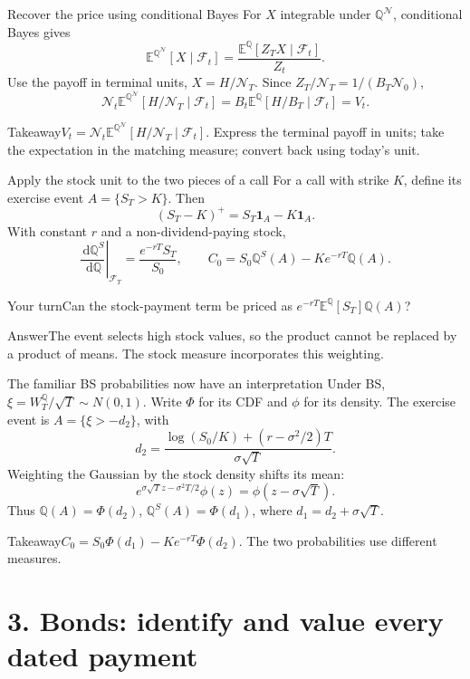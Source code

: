 \documentclass[handout,10pt,t,aspectratio=169]{beamer}
\newenvironment{pausebox}{\begin{block}{Your turn}}{\end{block}}
\newenvironment{answerbox}{\begin{exampleblock}{Answer}}{\end{exampleblock}}
\newenvironment{keybox}{\begin{exampleblock}{Takeaway}}{\end{exampleblock}}
\newcommand{\E}{\mathbb E}
\newcommand{\Q}{\mathbb Q}
\newcommand{\F}{\mathcal F}
\newcommand{\dd}{\,\mathrm d}
\newcommand{\ind}{\mathbf 1}
\begin{document}
\begin{frame}{Recover the price using conditional Bayes}
\small
For \(X\) integrable under \(\Q^{\mathcal N}\), conditional Bayes gives
\[
 \E^{\Q^{\mathcal N}}[X\mid\F_t]
 =\frac{\E^\Q[Z_TX\mid\F_t]}{Z_t}.
\]
Use the payoff in terminal units, \(X=H/\mathcal N_T\). Since
\(Z_T/\mathcal N_T=1/(B_T\mathcal N_0)\),
\[
 \mathcal N_t\E^{\Q^{\mathcal N}}[H/\mathcal N_T\mid\F_t]
 =B_t\E^\Q[H/B_T\mid\F_t]=V_t.
\]
\begin{keybox}\(\displaystyle\boxed{V_t=\mathcal N_t
 \E^{\Q^{\mathcal N}}[H/\mathcal N_T\mid\F_t].}\)
Express the terminal payoff in units; take the expectation in the matching measure;
convert back using today's unit.\end{keybox}
\end{frame}

\begin{frame}{Apply the stock unit to the two pieces of a call}
For a call with strike \(K\), define its exercise event \(A=\{S_T>K\}\).
Then
\[
 (S_T-K)^+=S_T\ind_A-K\ind_A.
\]
With constant \(r\) and a non-dividend-paying stock,
\[
 \left.\frac{\dd\Q^S}{\dd\Q}\right|_{\F_T}=\frac{e^{-rT}S_T}{S_0},
 \qquad
 \boxed{C_0=S_0\Q^S(A)-Ke^{-rT}\Q(A).}
\]
\begin{pausebox}Can the stock-payment term be priced as
\(e^{-rT}\E^\Q[S_T]\Q(A)\)?\end{pausebox}
\begin{answerbox}The event selects high stock values, so the product
cannot be replaced by a product of means. The stock measure incorporates this weighting.\end{answerbox}
\end{frame}

\begin{frame}{The familiar BS probabilities now have an interpretation}
\small
Under BS, \(\xi=W_T^\Q/\sqrt T\sim N(0,1)\). Write \(\Phi\) for its CDF
and \(\phi\) for its density. The exercise event is \(A=\{\xi>-d_2\}\), with
\[
 d_2=\frac{\log(S_0/K)+(r-\sigma^2/2)T}{\sigma\sqrt T}.
\]
Weighting the Gaussian by the stock density shifts its mean:
\[
 e^{\sigma\sqrt T z-\sigma^2T/2}\phi(z)=\phi(z-\sigma\sqrt T).
\]
Thus \(\Q(A)=\Phi(d_2)\), \(\Q^S(A)=\Phi(d_1)\), where \(d_1=d_2+\sigma\sqrt T\).
\begin{keybox}\(C_0=S_0\Phi(d_1)-Ke^{-rT}\Phi(d_2)\).
The two probabilities use different measures.\end{keybox}
\end{frame}

\section{3. Bonds: identify and value every dated payment}
\end{document}
